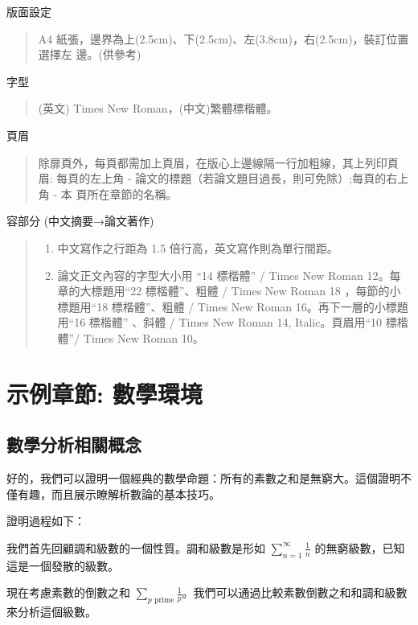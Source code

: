 \documentclass[
    writingLanguage=chinese, %
    addPageTitle=on,  %
    addDeclaration=on, %
    addMUSTlog=off, %
    addFigTOC=on, %
    addTabTOC=on, %
    refIndent=off, %
    printMod=off, %
]{must}
\begin{document}
\noindent\faHandORight 版面設定
\begin{quote}
A4 紙張，邊界為上(2.5cm)、下(2.5cm)、左(3.8cm)，右(2.5cm)，裝訂位置選擇左
邊。(供參考)

\end{quote}

\noindent\faHandORight 字型
\begin{quote}
(英文) Times New Roman，(中文)繁體標楷體。
\end{quote}

\noindent\faHandORight 頁眉
\begin{quote}
除扉頁外，每頁都需加上頁眉，在版心上邊線隔一行加粗線，其上列印頁眉:
每頁的左上角 - 論文的標題（若論文題目過長，則可免除）;每頁的右上角 - 本
頁所在章節的名稱。
\end{quote}

\noindent\faHandORight 容部分 (中文摘要→論文著作)
\begin{quote}
\begin{enumerate}
    \item 中文寫作之行距為 1.5 倍行高，英文寫作則為單行間距。
    \item 論文正文內容的字型大小用 “14 標楷體” / Times New Roman 12。每章的大標題用“22 標楷體”、粗體 / Times New Roman 18 ，每節的小標題用“18 標楷體”、粗體 / Times New Roman 16。再下一層的小標題用“16 標楷體” 、斜體 / Times New Roman 14, Italic。頁眉用“10 標楷體”/ Times New Roman 10。
\end{enumerate}
\end{quote}



 



\chapter{示例章節: 數學環境}
\section{數學分析相關概念}
好的，我們可以證明一個經典的數學命題：所有的素數之和是無窮大。這個證明不僅有趣，而且展示瞭解析數論的基本技巧。

證明過程如下：

我們首先回顧調和級數的一個性質。調和級數是形如 \( \sum_{n=1}^{\infty} \frac{1}{n} \) 的無窮級數，已知這是一個發散的級數。

現在考慮素數的倒數之和 \( \sum_{p \text{ prime}} \frac{1}{p} \)。我們可以通過比較素數倒數之和和調和級數來分析這個級數。
\end{document}
